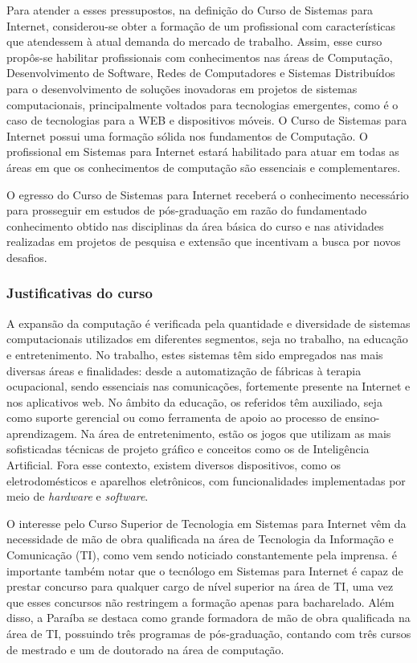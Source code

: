 Para atender a esses pressupostos, na definição do Curso de Sistemas para Internet, considerou-se obter a formação de um profissional com características que atendessem à atual demanda do mercado de trabalho. Assim, esse curso propôs-se habilitar profissionais com conhecimentos nas áreas de Computação, Desenvolvimento de Software, Redes de Computadores e Sistemas Distribu\'idos para o desenvolvimento de soluções inovadoras em projetos de sistemas computacionais, principalmente voltados para tecnologias emergentes, como \'e o caso de tecnologias para a WEB e dispositivos m\'oveis. O Curso de Sistemas para Internet possui uma formação sólida nos fundamentos de Computação. O profissional em Sistemas para Internet estará habilitado para atuar em todas as áreas em que os conhecimentos de computação são essenciais e complementares.  

O egresso do Curso de Sistemas para Internet receberá o conhecimento necessário para prosseguir em estudos de pós-graduação em razão do fundamentado conhecimento obtido nas disciplinas da área básica do curso e nas atividades realizadas em projetos de pesquisa e extensão que incentivam a busca por novos desafios.

\subsubsection{Justificativas do curso}

A expansão da computação é verificada pela quantidade e diversidade de sistemas computacionais utilizados em diferentes segmentos, seja no trabalho, na educação e entretenimento. No trabalho, estes sistemas têm sido empregados nas mais diversas áreas e finalidades: desde a automatização de fábricas à terapia ocupacional, sendo essenciais nas comunicações, fortemente presente na Internet e nos aplicativos web. No âmbito da educação, os referidos têm auxiliado, seja como suporte gerencial ou como ferramenta de apoio ao processo de ensino-aprendizagem. Na área de entretenimento, estão os jogos que utilizam as mais sofisticadas técnicas de projeto gráfico e conceitos como os de Inteligência Artificial. Fora esse contexto, existem diversos dispositivos, como os eletrodomésticos e aparelhos eletrônicos, com funcionalidades implementadas por meio de \textit{hardware} e \textit{software}.


O interesse pelo Curso Superior de Tecnologia em Sistemas para Internet vêm da necessidade de mão de obra qualificada na área de Tecnologia da Informação e Comunicação (TI), como vem sendo noticiado constantemente pela imprensa. é importante também notar que o tecnólogo em Sistemas para Internet é capaz de prestar concurso para qualquer cargo de nível superior na área de TI, uma vez que esses concursos não restringem a formação apenas para bacharelado. Além disso, a Paraíba se destaca como grande formadora de mão de obra qualificada na área de TI, possuindo três programas de pós-graduação, contando com três cursos de mestrado e um de doutorado na área de computação.%

